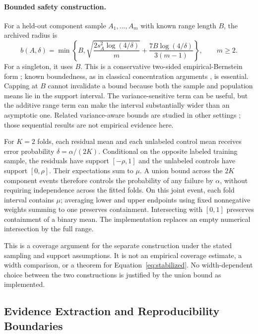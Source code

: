 \documentclass{article}
\begin{document}
\paragraph{Bounded safety construction.}
For a held-out component sample $A_1,\ldots,A_m$ with known range length $B$, the archived radius is
\begin{equation}
b(A,\delta)=\min\left\{B,\sqrt{\frac{2s_A^2\log(4/\delta)}{m}}
+\frac{7B\log(4/\delta)}{3(m-1)}\right\},\qquad m\geq2.
\label{eq:eb}
\end{equation}
For a singleton, it uses $B$. This is a conservative two-sided empirical-Bernstein form \citep{MaurerPontil2009}; known boundedness, as in classical concentration arguments \citep{Hoeffding1963}, is essential. Capping at $B$ cannot invalidate a bound because both the sample and population means lie in the support interval. The variance-sensitive term can be useful, but the additive range term can make the interval substantially wider than an asymptotic one. Related variance-aware bounds are studied in other settings \citep{Audibert2009}; those sequential results are not empirical evidence here.

For $K=2$ folds, each residual mean and each unlabeled control mean receives error probability $\delta=\alpha/(2K)$. Conditional on the opposite labeled training sample, the residuals have support $[-\rho,1]$ and the unlabeled controls have support $[0,\rho]$. Their expectations sum to $\mu$. A union bound across the $2K$ component events therefore controls the probability of any failure by $\alpha$, without requiring independence across the fitted folds. On this joint event, each fold interval contains $\mu$; averaging lower and upper endpoints using fixed nonnegative weights summing to one preserves containment. Intersecting with $[0,1]$ preserves containment of a binary mean. The implementation replaces an empty numerical intersection by the full range.

This is a coverage argument for the separate construction under the stated sampling and support assumptions. It is not an empirical coverage estimate, a width comparison, or a theorem for Equation~\ref{eq:stabilized}. No width-dependent choice between the two constructions is justified by the union bound as implemented.

\subsection{Evidence Extraction and Reproducibility Boundaries}
\label{sec:reproduce}
\end{document}
